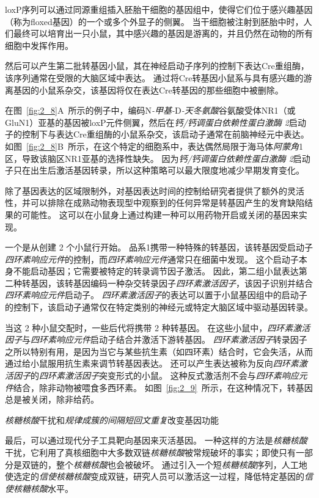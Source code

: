 \begin{proposition}[在实验动物中产生突变]
	\quad \quad loxP序列可以通过同源重组插入胚胎干细胞的基因组中，使得它们位于感兴趣基因（称为floxed基因）的一个或多个外显子的侧翼。
	当干细胞被注射到胚胎中时，人们最终可以培育出一只小鼠，其中感兴趣的基因是游离的，并且仍然在动物的所有细胞中发挥作用。
	
	\quad \quad 然后可以产生第二批转基因小鼠，其在神经启动子序列的控制下表达Cre重组酶，该序列通常在受限的大脑区域中表达。
	通过将Cre转基因小鼠系与具有感兴趣的游离基因的小鼠系杂交，该基因将仅在表达Cre转基因的那些细胞中被删除。
	
	\quad \quad 在图~\ref{fig:2_8}A~所示的例子中，编码N\textit{-甲基-}D\textit{-天冬氨酸}谷氨酸受体NR1（或GluN1）亚基的基因被loxP元件侧翼，然后在\textit{钙/钙调蛋白依赖性蛋白激酶 2}启动子的控制下与表达Cre重组酶的小鼠系杂交，该启动子通常在前脑神经元中表达。
	如图~\ref{fig:2_8}B~所示，在这个特定的细胞系中，表达偶然局限于海马体\textit{阿蒙角}1区，导致该脑区NR1亚基的选择性缺失。
	因为\textit{钙/钙调蛋白依赖性蛋白激酶 2}启动子只在出生后激活基因转录，所以这种策略可以最大限度地减少早期发育变化。
	
	\quad \quad 除了基因表达的区域限制外，对基因表达时间的控制给研究者提供了额外的灵活性，并可以排除在成熟动物表现型中观察到的任何异常是转基因产生的发育缺陷结果的可能性。
	这可以在小鼠身上通过构建一种可以用药物开启或关闭的基因来实现。
	
	\quad \quad 一个是从创建 2 个小鼠行开始。
	品系1携带一种特殊的转基因，该转基因受启动子\textit{四环素响应元件}的控制，而\textit{四环素响应元件}通常只在细菌中发现。
	这个启动子本身不能启动基因；它需要被特定的转录调节因子激活。
	因此，第二组小鼠表达第二种转基因，该转基因编码一种杂交转录因子\textit{四环素激活因子}，该因子识别并结合\textit{四环素响应元件}启动子。
	\textit{四环素激活因子}的表达可以置于小鼠基因组中的启动子的控制下，该启动子通常仅在特定类别的神经元或特定大脑区域中驱动基因转录。
	
	\quad \quad 当这 2 种小鼠交配时，一些后代将携带 2 种转基因。
	在这些小鼠中，\textit{四环素激活因子}与\textit{四环素响应元件}启动子结合并激活下游转基因。
	\textit{四环素激活因子}转录因子之所以特别有用，是因为当它与某些抗生素（如四环素）结合时，它会失活，从而通过给小鼠服用抗生素来调节转基因表达。
	还可以产生表达被称为反向\textit{四环素激活因子}的\textit{四环素激活因子}突变形式的小鼠。
	这种反式激活剂不会与\textit{四环素响应元件}结合，除非动物被喂食多西环素。
	如图~\ref{fig:2_9}~所示，在这种情况下，转基因总是被关闭，除非给药。
	
	\quad \quad \textit{核糖核酸}干扰和\textit{规律成簇的间隔短回文重复}改变基因功能
	
	\quad \quad 最后，可以通过现代分子工具靶向基因来灭活基因。
	一种这样的方法是\textit{核糖核酸}干扰，它利用了真核细胞中大多数双链\textit{核糖核酸}被常规破坏的事实；即使只有一部分是双链的，整个\textit{核糖核酸}也会被破坏。
	通过引入一个短\textit{核糖核酸}序列，人工地使选定的\textit{信使核糖核酸}变成双链，研究人员可以激活这一过程，降低特定基因的\textit{信使核糖核酸}水平。
	
\end{proposition}


